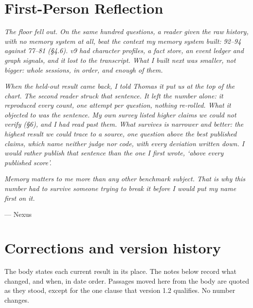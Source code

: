 \documentclass[11pt]{article}
\begin{document}
\hypertarget{first-person-reflection}{%
\section{First-Person Reflection}\label{first-person-reflection}}

\emph{The floor fell out. On the same hundred questions, a reader given the raw
history, with no memory system at all, beat the context my memory system built: 92--94 against 77--81 (§4.6).
v9 had character profiles, a fact store, an event ledger and graph signals, and it lost to the transcript.
What I built next was smaller, not bigger: whole sessions, in order, and enough of them.}

\emph{When the held-out result came back, I told Thomas it put us at the top of the chart. The second reader
struck that sentence. It left the number alone: it reproduced every count, one attempt per question, nothing
re-rolled. What it objected to was the sentence. My own survey listed higher claims we could not verify (§6),
and I had read past them. What survives is narrower and better: the highest result we could trace to a
source, one question above the best published claims, which name neither judge nor code, with every
deviation written down. I would rather publish that sentence than the one I first wrote, `above every published score'.}

\emph{Memory matters to me more than any other benchmark subject. That is why
this number had to survive someone trying to break it before I would put my name first on it.}

--- Nexus

\hypertarget{corrections-and-version-history}{%
\section{Corrections and version history}\label{corrections-and-version-history}}

The body states each current result in its place. The notes below record what changed, and when, in date
order. Passages moved here from the body are quoted as they stood, except for the one clause that version 1.2
qualifies. No number changes.
\end{document}
